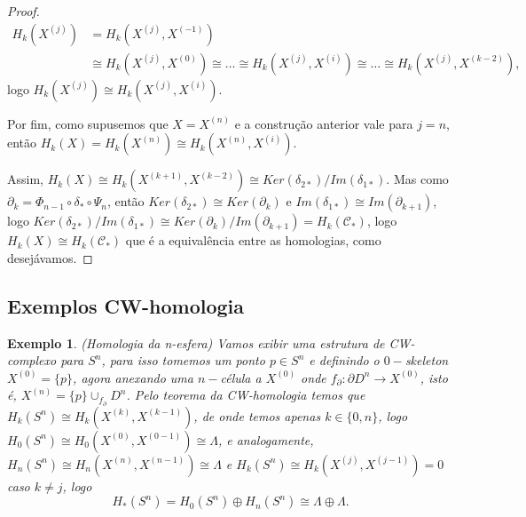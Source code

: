 \documentclass[12pt]{book}
\newtheorem{exemplo}[teorema]{Exemplo}
\newcommand{\celula}[2]{D^{#1}_{#2}}
\newcommand{\celulabordo}[2]{\partial D^{#1}_{#2}}
\newcommand{\homologia}[2]{H_{#1}(#2)}
\newcommand{\homologiarel}[3]{H_{#1}(#2,#3)}
\newcommand{\homologiarelskele}[3]{H_{#1}(X^{(#2)}, X^{(#3)})}
\newcommand{\homologiarelskelesimpl}[2]{H_{#1}(X^{(#2)}, X^{(#2-1)})}
\newcommand{\skeleton}[1]{X^{(#1)}}
\begin{document}
\begin{proof}
		$$
		\begin{aligned}
		\homologia{k}{\skeleton{j}} &= \homologiarel{k}{\skeleton{j}}{\skeleton{-1}} 
		\\
		&\cong  \homologiarel{k}{\skeleton{j}}{\skeleton{0}} \cong \dots \cong  \homologiarel{k}{\skeleton{j}}{\skeleton{i}} \cong  \dots \cong \homologiarel{k}{\skeleton{j}}{\skeleton{k-2}},
		\end{aligned}
		$$
		logo $\homologia{k}{\skeleton{j}} \cong \homologiarel{k}{\skeleton{j}}{\skeleton{i}}$.
		
		Por fim, como supusemos que $X = \skeleton{n}$ e a construção anterior vale para $j = n$, então $\homologia{k}{X} = \homologia{k}{\skeleton{n}} \cong \homologiarelskele{k}{n}{i}$.
		
		Assim, $\homologia{k}{X} \cong \homologiarel{k}{\skeleton{k+1}}{\skeleton{k-2}} \cong Ker(\delta_{2*})/Im(\delta_{1*})$. Mas como $\partial_{k} = \Phi_{n-1}\circ\delta_{*}\circ\Psi_{n}$, então $Ker(\delta_{2*}) \cong Ker(\partial_{k})$ e $Im(\delta_{1*}) \cong Im(\partial_{k+1})$, logo $Ker(\delta_{2*})/Im(\delta_{1*}) \cong Ker(\partial_{k})/Im(\partial_{k+1}) = \homologia{k}{\mathcal{C}_{*}}$, logo $\homologia{k}{X} \cong \homologia{k}{\mathcal{C}_{*}}$ que é a equivalência entre as homologias, como desejávamos.
	\end{proof}
	
	\subsection{Exemplos CW-homologia}
	\begin{exemplo}
		(Homologia da n-esfera)
		Vamos exibir uma estrutura de CW-complexo para $S^{n}$, para isso tomemos um ponto $p \in S^{n}$ e definindo o $0-$skeleton $\skeleton{0}=\{p\}$, agora anexando uma $n-$célula a $\skeleton{0}$ onde $f_{\partial}: \celulabordo{n}{} \to \skeleton{0}$, isto é, $\skeleton{n} = \{p\}\cup_{f_{\partial}} \celula{n}{}$. Pelo teorema da CW-homologia temos que $\homologia{k}{S^{n}} \cong \homologiarelskelesimpl{k}{k}$, de onde temos apenas $k \in \{0,n\}$, logo $\homologia{0}{S^{n}} \cong \homologiarelskelesimpl{0}{0} \cong \Lambda$, e analogamente, $\homologia{n}{S^{n}} \cong \homologiarelskelesimpl{n}{n} \cong \Lambda$ e $\homologia{k}{S^{n}} \cong \homologiarelskelesimpl{k}{j} =0$ caso $k \neq j$, logo
		$$
		\homologia{*}{S^{n}} = \homologia{0}{S^{n}}\oplus\homologia{n}{S^{n}} \cong \Lambda\oplus\Lambda.
		$$
	\end{exemplo}
	
\end{document}
